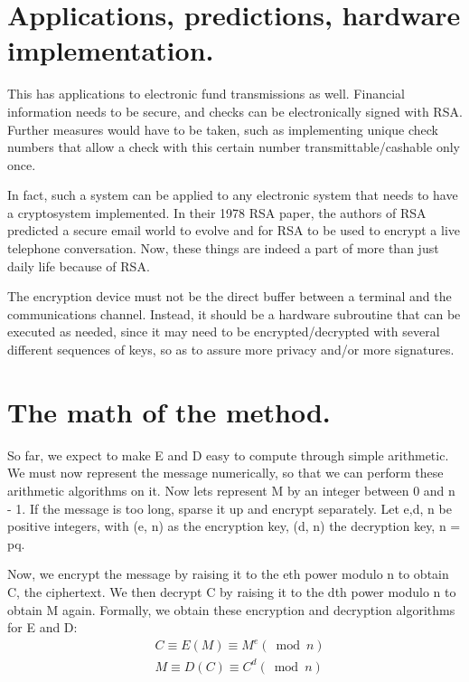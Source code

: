 \documentclass{article}
\begin{document}
\section{Applications, predictions, hardware implementation.}

This has applications to electronic fund transmissions as well. Financial information needs to be secure, and checks can be electronically signed with RSA. Further measures would have to be taken, such as implementing unique check numbers that allow a check with this certain number transmittable/cashable only once. 
\\\par\setlength\parindent{2em}

In fact, such a system can be applied to any electronic system that needs to have a cryptosystem implemented. In their 1978 RSA paper, the authors of RSA predicted a secure email world to evolve and for RSA to be used to encrypt a live telephone conversation. Now, these things are indeed a part of more than just daily life because of RSA. 
\\\par\setlength\parindent{2em}

The encryption device must not be the direct buffer between a terminal and the communications channel. Instead, it should be a hardware subroutine that can be executed as needed, since it may need to be encrypted/decrypted with several different sequences of keys, so as to assure more privacy and/or more signatures. 


\section{The math of the method.}

So far, we expect to make E and D easy to compute through simple arithmetic. We must now represent the message numerically, so that we can perform these arithmetic algorithms on it. Now lets represent M by an integer between 0 and n - 1. If the message is too long, sparse it up and encrypt separately. Let e,d, n be positive integers, with (e, n) as the encryption key, (d, n) the decryption key, n = pq. 
\\\par\setlength\parindent{2em}

Now, we encrypt the message by raising it to the eth power modulo n to obtain C, the ciphertext. We then decrypt C by raising it to the dth power modulo n to obtain M again. Formally, we obtain these encryption and decryption algorithms for E and D:
\begin{equation}
\begin{split}
&C\equiv E(M)\equiv M^e(\bmod n)\\
&M\equiv D(C)\equiv C^d(\bmod n)
\end{split}
\end{equation}
\end{document}
